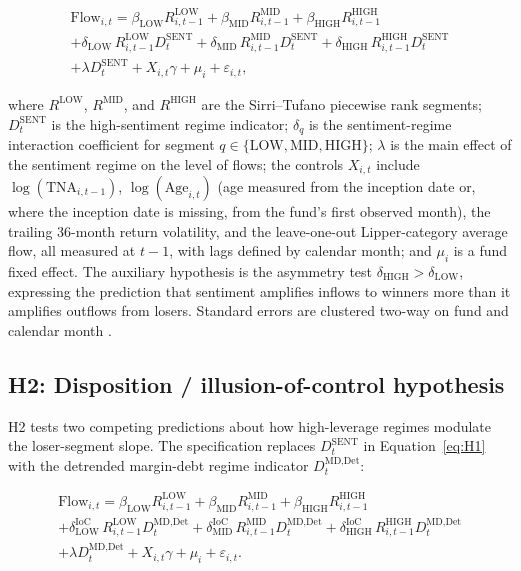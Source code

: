 \documentclass[12pt, oneside]{report}
\begin{document}
\begin{multline}
\text{Flow}_{i,t} =
  \beta_{\text{LOW}} R^{\text{LOW}}_{i,t-1}
+ \beta_{\text{MID}} R^{\text{MID}}_{i,t-1}
+ \beta_{\text{HIGH}} R^{\text{HIGH}}_{i,t-1} \\
+ \delta_{\text{LOW}}\, R^{\text{LOW}}_{i,t-1} D^{\text{SENT}}_t
+ \delta_{\text{MID}}\, R^{\text{MID}}_{i,t-1} D^{\text{SENT}}_t
+ \delta_{\text{HIGH}}\, R^{\text{HIGH}}_{i,t-1} D^{\text{SENT}}_t \\
+ \lambda D^{\text{SENT}}_t + X_{i,t} \gamma + \mu_i + \varepsilon_{i,t},
\label{eq:H1}
\end{multline}

\noindent where $R^{\text{LOW}}$, $R^{\text{MID}}$, and $R^{\text{HIGH}}$
are the Sirri--Tufano piecewise rank segments; $D^{\text{SENT}}_t$ is
the high-sentiment regime indicator; $\delta_q$ is the
sentiment-regime interaction coefficient for segment $q \in
\{\text{LOW}, \text{MID}, \text{HIGH}\}$; $\lambda$ is the main
effect of the sentiment regime on the level of flows; the controls
$X_{i,t}$ include $\log(\text{TNA}_{i,t-1})$, $\log(\text{Age}_{i,t})$
(age measured from the inception date or, where the inception date is
missing, from the fund's first observed month),
the trailing 36-month return volatility, and the leave-one-out
Lipper-category average flow, all measured at $t-1$, with lags defined
by calendar month; and $\mu_i$ is
a fund fixed effect. The auxiliary hypothesis is the asymmetry test
$\delta_{\text{HIGH}} > \delta_{\text{LOW}}$, expressing the
prediction that sentiment amplifies inflows to winners more than it
amplifies outflows from losers. Standard errors are clustered
two-way on fund and calendar month \parencite{Petersen2009}.

\subsection{H2: Disposition / illusion-of-control hypothesis}
\label{sec:H2_method}

\noindent H2 tests two competing predictions about how high-leverage
regimes modulate the loser-segment slope. The specification replaces
$D^{\text{SENT}}_t$ in Equation~\ref{eq:H1} with the detrended
margin-debt regime indicator $D^{\text{MD,Det}}_t$:

\begin{multline}
\text{Flow}_{i,t} =
  \beta_{\text{LOW}} R^{\text{LOW}}_{i,t-1}
+ \beta_{\text{MID}} R^{\text{MID}}_{i,t-1}
+ \beta_{\text{HIGH}} R^{\text{HIGH}}_{i,t-1} \\
+ \delta^{\text{IoC}}_{\text{LOW}}\, R^{\text{LOW}}_{i,t-1} D^{\text{MD,Det}}_t
+ \delta^{\text{IoC}}_{\text{MID}}\, R^{\text{MID}}_{i,t-1} D^{\text{MD,Det}}_t
+ \delta^{\text{IoC}}_{\text{HIGH}}\, R^{\text{HIGH}}_{i,t-1} D^{\text{MD,Det}}_t \\
+ \lambda D^{\text{MD,Det}}_t + X_{i,t} \gamma + \mu_i + \varepsilon_{i,t}.
\label{eq:H2}
\end{multline}
\end{document}
